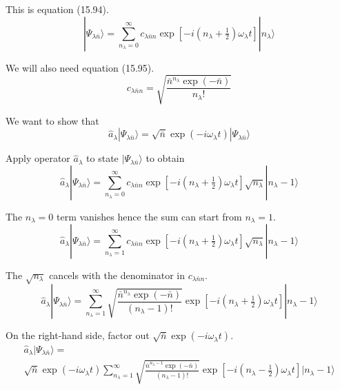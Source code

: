 


\bigskip
This is equation (15.94).
\begin{equation*}
|\Psi_{\lambda\bar n}\rangle=\sum_{n_\lambda=0}^\infty
c_{\lambda\bar nn}
\exp\left[-i\left(n_\lambda+\tfrac{1}{2}\right)\omega_\lambda t\right]
|n_\lambda\rangle
\tag{15.94}
\end{equation*}

We will also need equation (15.95).
\begin{equation*}
c_{\lambda\bar nn}
=\sqrt{\frac{\bar n^{n_\lambda}\exp(-\bar n)}{n_\lambda!}}
\tag{15.95}
\end{equation*}

We want to show that
\begin{equation*}
\hat a_\lambda|\Psi_{\lambda\bar n}\rangle
=\sqrt{\bar n}\exp(-i\omega_\lambda t)|\Psi_{\lambda\bar n}\rangle
\end{equation*}

Apply operator $\hat a_\lambda$ to state $|\Psi_{\lambda\bar n}\rangle$ to obtain
\begin{equation*}
\hat a_\lambda|\Psi_{\lambda\bar n}\rangle
=\sum_{n_\lambda=0}^\infty
c_{\lambda\bar nn}
\exp\left[-i\left(n_\lambda+\tfrac{1}{2}\right)\omega_\lambda t\right]
\sqrt{n_\lambda}|n_\lambda-1\rangle
\end{equation*}

The $n_\lambda=0$ term vanishes hence the sum can start from $n_\lambda=1$.
\begin{equation*}
\hat a_\lambda|\Psi_{\lambda\bar n}\rangle
=\sum_{n_\lambda=1}^\infty
c_{\lambda\bar nn}
\exp\left[-i\left(n_\lambda+\tfrac{1}{2}\right)\omega_\lambda t\right]
\sqrt{n_\lambda}|n_\lambda-1\rangle
\end{equation*}

The $\sqrt{n_\lambda}$ cancels with the denominator in $c_{\lambda\bar nn}$.
\begin{equation*}
\hat a_\lambda|\Psi_{\lambda\bar n}\rangle
=\sum_{n_\lambda=1}^\infty
\sqrt{\frac{\bar n^{n_\lambda}\exp(-\bar n)}{(n_\lambda-1)!}}
\exp\left[-i\left(n_\lambda+\tfrac{1}{2}\right)\omega_\lambda t\right]
|n_\lambda-1\rangle
\end{equation*}

On the right-hand side, factor out $\sqrt{\bar n}\exp(-i\omega_\lambda t)$.
\begin{multline*}
\hat a_\lambda|\Psi_{\lambda\bar n}\rangle=
\\
\sqrt{\bar n}\exp(-i\omega_\lambda t)
\sum_{n_\lambda=1}^\infty
\sqrt{\frac{\bar n^{n_\lambda-1}\exp(-\bar n)}{(n_\lambda-1)!}}
\exp\left[-i\left(n_\lambda-\tfrac{1}{2}\right)\omega_\lambda t\right]
|n_\lambda-1\rangle
\end{multline*}

